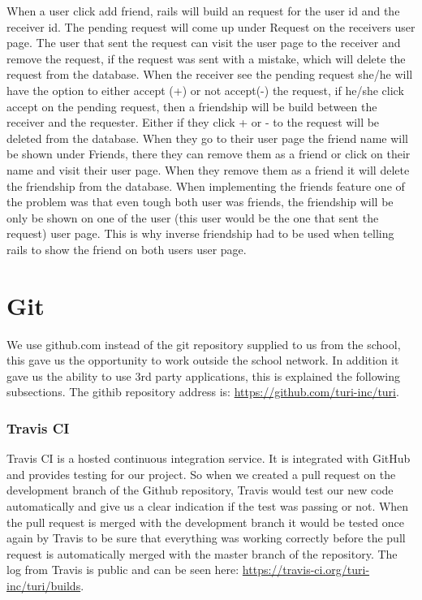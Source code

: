 \documentclass[a4paper]{article}
\begin{document}
\noindent
When a user click add friend, rails will build an request for the user id and the receiver id. The pending request will come up under Request on the receivers user page. The user that sent the request can visit the user page to the receiver and remove the request, if the request was sent with a mistake, which will delete the request from the database. When the receiver see the pending request she/he will have the option to either accept (+) or not accept(-) the request, if he/she click accept on the pending request, then a friendship will be build between the receiver and the requester. Either if they click + or - to the request will be deleted from the database. When they go to their user page the friend name will be shown under Friends, there they can remove them as a friend or click on their name and visit their user page. When they remove them as a friend it will delete the friendship from the database. When implementing the friends feature one of the problem was that even tough both user was friends, the friendship will be only be shown on one of the user (this user would be the one that sent the request) user page. This is why inverse friendship had to be used when telling rails to show the friend on both users user page. \\


\section{Git}
We use github.com instead of the git repository supplied to us from the school, this gave us the opportunity to work outside the school network. In addition it gave us the ability to use 3rd party applications, this is explained the following subsections. The githib repository address is: \url{https://github.com/turi-inc/turi}.

\subsubsection{Travis CI}
Travis CI is a hosted continuous integration service. It is integrated with GitHub and provides testing for our project. So when we created a pull request on the development branch of the Github repository, Travis would test our new code automatically and give us a clear indication if the test was passing or not. When the pull request is merged with the development branch it would be tested once again by Travis to be sure that everything was working correctly before the pull request is automatically merged with the master branch of the repository. The log from Travis is public and can be seen here: \url{https://travis-ci.org/turi-inc/turi/builds}.
\end{document}
